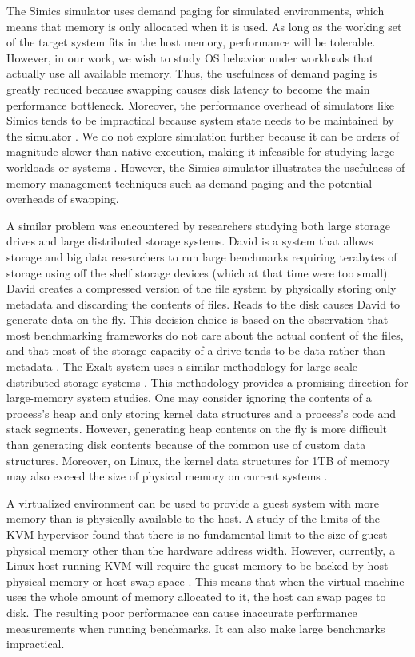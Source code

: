 \documentclass[twocolumn,11pt]{article}
\begin{document}
The Simics simulator uses demand paging for simulated environments, which means
that memory is only allocated when it is used. As long as the working set of
the target system fits in the host memory, performance will be tolerable.
However, in our work, we wish to study OS behavior under workloads that
actually use all available memory. Thus, the usefulness of demand paging is
greatly reduced because swapping causes disk latency to become the main
performance bottleneck. Moreover, the performance overhead of simulators like
Simics tends to be impractical because system state needs to be maintained by
the simulator \cite{simics}. We do not explore simulation further because it
can be orders of magnitude slower than native execution, making it infeasible
for studying large workloads or systems \cite{2kmachine}. However, the Simics
simulator illustrates the usefulness of memory management techniques such as
demand paging and the potential overheads of swapping.

A similar problem was encountered by researchers studying both large storage
drives and large distributed storage systems. David is a system that allows
storage and big data researchers to run large benchmarks requiring terabytes of
storage using off the shelf storage devices (which at that time were too small).
David creates a compressed version of the file system by physically storing only
metadata and discarding the contents of files. Reads to the disk causes David to
generate data on the fly. This decision choice is based on the observation that
most benchmarking frameworks do not care about the actual content of the files,
and that most of the storage capacity of a drive tends to be data rather than
metadata \cite{david}. The Exalt system uses a similar methodology for
large-scale distributed storage systems \cite{exalt}. This methodology provides
a promising direction for large-memory system studies. One may consider ignoring
the contents of a process’s heap and only storing kernel data structures and a
process’s code and stack segments. However, generating heap contents on the fly
is more difficult than generating disk contents because of the common use of
custom data structures. Moreover, on Linux, the kernel data structures for 1TB
of memory may also exceed the size of physical memory on current systems
\cite{simics}.

A virtualized environment can be used to provide a guest system with more memory
than is physically available to the host. A study of the limits of the KVM
hypervisor found that there is no fundamental limit to the size of guest
physical memory other than the hardware address width. However, currently, a
Linux host running KVM will require the guest memory to be backed by host
physical memory or host swap space \cite{ibmkvm}.  This means that when the
virtual machine uses the whole amount of memory allocated to it, the host can
swap pages to disk. The resulting poor performance can cause inaccurate
performance measurements when running benchmarks. It can also make large
benchmarks impractical.
\end{document}
